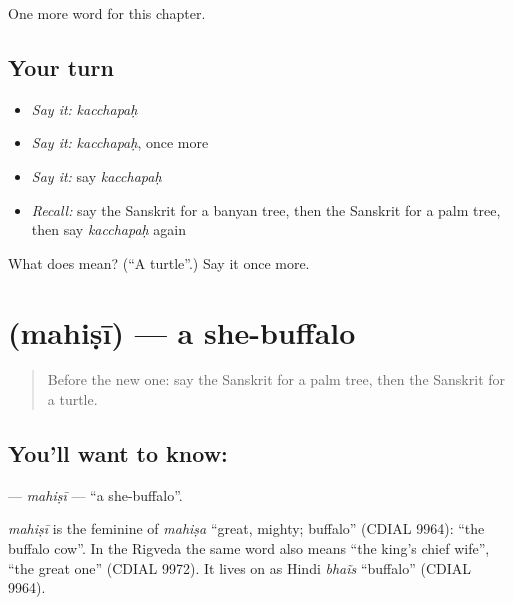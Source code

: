 \begin{grammarlens}[title={What you've built}]
One more word for this chapter.
\end{grammarlens}

\subsection*{Your turn}
\begin{itemize}
\raggedright
  \item \emph{Say it:} \emph{kacchapaḥ}
  \item \emph{Say it:} \emph{kacchapaḥ}, once more
  \item \emph{Say it:} say \emph{kacchapaḥ}
  \item \emph{Recall:} say the Sanskrit for a banyan tree, then the Sanskrit for a palm tree, then say \emph{kacchapaḥ} again
\end{itemize}

\begin{tcolorbox}[breakable,colback=teal!4,colframe=teal!35!black,title={Before you move on}]
What does  mean? (\textquotedblleft{}A turtle\textquotedblright{}.) Say it once more.
\end{tcolorbox}
\section[\texorpdfstring{\sk{महिषी} (mahiṣī)}{महिषी (mahiṣī)}]{ (mahiṣī) — a she-buffalo}

\label{lesson:SA-C167-mahisi}



\begin{quote}
Before the new one: say the Sanskrit for a palm tree, then the Sanskrit for a turtle.
\end{quote}

\subsection*{You'll want to know: }
\textbf{} — \emph{mahiṣī} — \textquotedblleft{}a she-buffalo\textquotedblright{}.

\begin{cousinweb}
\emph{mahiṣī} is the feminine of \emph{mahiṣa} \textquotedblleft{}great, mighty; buffalo\textquotedblright{} (CDIAL 9964): \textquotedblleft{}the buffalo cow\textquotedblright{}. In the Rigveda the same word also means \textquotedblleft{}the king's chief wife\textquotedblright{}, \textquotedblleft{}the great one\textquotedblright{} (CDIAL 9972). It lives on as Hindi \emph{bhaĩs} \textquotedblleft{}buffalo\textquotedblright{} (CDIAL 9964).
\end{cousinweb}

